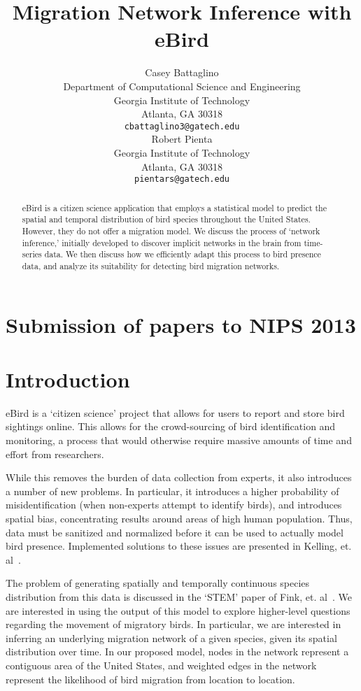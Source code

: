\documentclass{article} %
\title{Migration Network Inference with eBird}
\author{
Casey Battaglino \\
Department of Computational Science and Engineering\\
Georgia Institute of Technology\\
Atlanta, GA 30318 \\
\texttt{cbattaglino3@gatech.edu} \\
\And
Robert Pienta \\
Georgia Institute of Technology \\
Atlanta, GA 30318 \\
\texttt{pientars@gatech.edu} \\
}
\begin{document}
\maketitle

\begin{abstract}
eBird is a citizen science application that employs a statistical model to predict the spatial and temporal distribution of bird species throughout the United States. However, they do not offer a migration model. We discuss the process of `network inference,' initially developed to discover implicit networks in the brain from time-series data. We then discuss how we efficiently adapt this process to bird presence data, and analyze its suitability for detecting bird migration networks. 
\end{abstract}

\section{Submission of papers to NIPS 2013}


\section{Introduction}
eBird\cite{DBLP:conf/iaai/KellingGFLWYDG12} is a `citizen science' project that allows for users to report and store bird sightings online. This allows for the crowd-sourcing of bird identification and monitoring, a process that would otherwise require massive amounts of time and effort from researchers. 

While this removes the burden of data collection from experts, it also introduces a number of new problems. In particular, it introduces a higher probability of misidentification (when non-experts attempt to identify birds), and introduces spatial bias, concentrating results around areas of high human population. Thus, data must be sanitized and normalized before it can be used to actually model bird presence. Implemented solutions to these issues are presented in Kelling, et. al~\cite{DBLP:conf/iaai/KellingGFLWYDG12}.

The problem of generating spatially and temporally continuous species distribution from this data is discussed in the `STEM' paper of Fink, et. al~\cite{stem}. We are interested in using the output of this model to explore higher-level questions regarding the movement of migratory birds. In particular, we are interested in inferring an underlying migration network of a given species, given its spatial distribution over time. In our proposed model, nodes in the network represent a contiguous area of the United States, and weighted edges in the network represent the likelihood of bird migration from location to location. 
\end{document}
